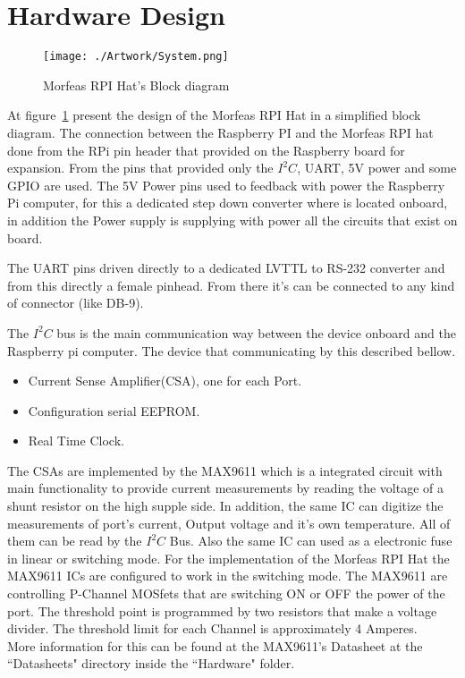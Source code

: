 \section{Hardware Design}
\begin{figure}[h]
	\centering
	\texttt{[image: ./Artwork/System.png]}
	\caption{Morfeas RPI Hat's Block diagram}
	\label{fig:block}
\end{figure}

At figure~\ref{fig:block} present the design of the Morfeas RPI Hat in a simplified block diagram. The connection between the Raspberry PI and the Morfeas RPI hat done
from the RPi pin header that provided on the Raspberry board for expansion. From the pins that provided only the $I^2C$, UART, 5V power and some GPIO are used.
The 5V Power pins used to feedback with power the Raspberry Pi computer, for this a dedicated step down converter where is located onboard,
in addition the Power supply is supplying with power all the circuits that exist on board.

The UART pins driven directly to a dedicated LVTTL to RS-232 converter and from this directly a female pinhead. From there it's can be connected to any kind of connector
(like DB-9).

The $I^2C$ bus is the main communication way between the device onboard and the Raspberry pi computer. The device that communicating by this described bellow.
\begin{itemize}
	\item Current Sense Amplifier(CSA), one for each Port.
	\item Configuration serial EEPROM.
	\item Real Time Clock.
\end{itemize}

The CSAs are implemented by the MAX9611 which is a integrated circuit with main functionality to provide current measurements by reading the voltage of a shunt resistor on the high supple side.
In addition, the same IC can digitize the measurements of port's current, Output voltage and it's own temperature. All of them can be read by the $I^2C$ Bus.
Also the same IC can used as a electronic fuse in linear or switching mode.
For the implementation of the Morfeas RPI Hat the MAX9611 ICs are configured to work in the switching mode.
The MAX9611 are controlling P-Channel MOSfets that are switching ON or OFF the power of the port.
The threshold point is programmed by two resistors that make a voltage divider. The threshold limit for each Channel is approximately 4 Amperes.\\
More information for this can be found at the MAX9611's Datasheet at the ``Datasheets" directory inside the ``Hardware" folder.

